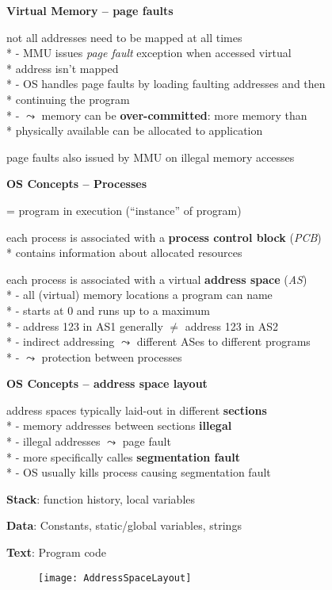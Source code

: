 \textbf{Virtual Memory -- page faults}
\begin{items}
	\item not all addresses need to be mapped at all times
		\\*
		- MMU issues \emph{page fault} exception when accessed virtual \\* \phantom{-} address isn't mapped
		\\*
		- OS handles page faults by loading faulting addresses and then \\* \phantom{-} continuing the program
		\\*
		- \( \leadsto \) memory can be \textbf{over-committed}: more memory than \\* \phantom{-} physically available can be allocated to application
	\item page faults also issued by MMU on illegal memory accesses
\end{items}

\textbf{OS Concepts -- Processes}
\begin{items}
	\item = program in execution ("`instance"' of program)
	\item each process is associated with a \textbf{process control block} (\emph{PCB})
		\\*
		contains information about allocated resources
	\item each process is associated with a virtual \textbf{address space} (\emph{AS})
		\\*
		- all (virtual) memory locations a program can name
		\\*
		- starts at 0 and runs up to a maximum
		\\*
		- address 123 in AS1 generally \( \neq \) address 123 in AS2
		\\*
		- indirect addressing \( \leadsto \) different ASes to different programs
		\\*
		- \( \leadsto \) protection between processes
\end{items}

\newpage

\textbf{OS Concepts -- address space layout}
\begin{items}
	\item address spaces typically laid-out in different \textbf{sections}
		\\*
		- memory addresses between sections \textbf{illegal}
		\\*
		- illegal addresses \( \leadsto \) page fault
		\\*
		- more specifically calles \textbf{segmentation fault}
		\\*
		- OS usually kills process causing segmentation fault
	\item \textbf{Stack}: function history, local variables
	\item \textbf{Data}: Constants, static/global variables, strings
	\item \textbf{Text}: Program code
	\begin{figure}[H]\centering\label{AddressSpaceLayout}\texttt{[image: AddressSpaceLayout]}\end{figure}
\end{items}